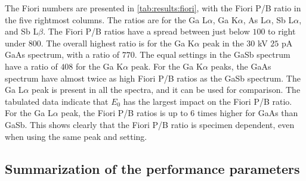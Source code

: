 The Fiori numbers are presented in \cref{tab:results:fiori}, with the Fiori P/B ratio in the five rightmost columns.
The ratios are for the Ga L$\alpha$, Ga K$\alpha$, As L$\alpha$, Sb L$\alpha$, and Sb L$\beta$.
The Fiori P/B ratios have a spread between just below $100$ to right under $800$.
The overall highest ratio is for the Ga K$\alpha$ peak in the $30$ kV $25$ pA GaAs spectrum, with a ratio of $770$.
The equal settings in the GaSb spectrum have a ratio of $408$ for the Ga K$\alpha$ peak.
For the Ga K$\alpha$ peaks, the GaAs spectrum have almost twice as high Fiori P/B ratios as the GaSb spectrum.
The Ga L$\alpha$ peak is present in all the spectra, and it can be used for comparison.
The tabulated data indicate that $E_0$ has the largest impact on the Fiori P/B ratio.
For the Ga L$\alpha$ peak, the Fiori P/B ratios is up to $6$ times higher for GaAs than GaSb.
This shows clearly that the Fiori P/B ratio is specimen dependent, even when using the same peak and setting.













\clearpage


\subsection{Summarization of the performance parameters}
\label{results:summarization_of_the_performance_parameters}

